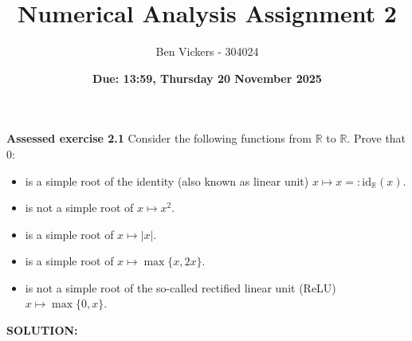 \documentclass[]{article}
\title{\textbf{Numerical Analysis Assignment 2}}
\author{Ben Vickers - 304024}
\date{\textbf{Due: 13:59, Thursday 20 November 2025}}
\begin{document}
	\maketitle
\noindent\textbf{Assessed exercise 2.1} Consider the following functions from \(\mathbb{R}\) to \(\mathbb{R}\). Prove that \(0\):
\begin{itemize}
  \item is a simple root of the identity (also known as linear unit) \(x \mapsto x =: \mathrm{id}_{\mathbb{R}}(x)\).
  \item is not a simple root of \(x \mapsto x^{2}\).
  \item is a simple root of \(x \mapsto |x|\).
  \item is a simple root of \(x \mapsto \max\{x,2x\}\).
  \item is not a simple root of the so-called rectified linear unit (ReLU) \(x \mapsto \max\{0,x\}\).
\end{itemize}

\noindent \textbf{SOLUTION:}
\end{document}
